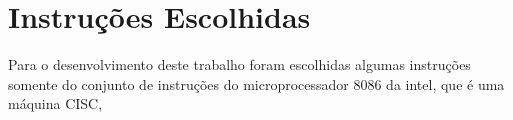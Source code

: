 \section{Instruções Escolhidas}

Para o desenvolvimento deste trabalho foram escolhidas algumas instruções somente do conjunto de instruções do microprocessador 8086 da intel, que é uma máquina CISC,